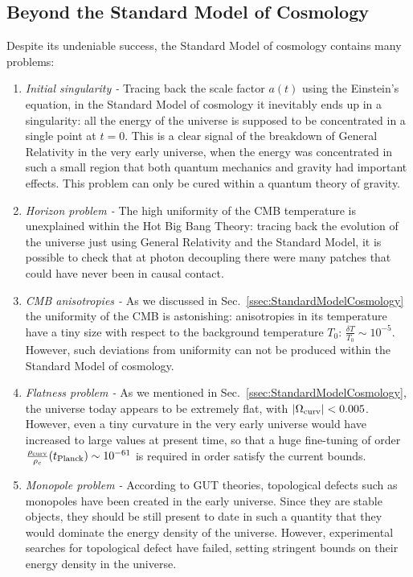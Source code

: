 \documentclass[12pt,a4paper]{book}
\newcommand{\ben}{\begin{enumerate}}
\newcommand{\een}{\end{enumerate}}
\begin{document}
\subsection{Beyond the Standard Model of Cosmology}
\label{ssec:BSMCosmology}

Despite its undeniable success, the Standard Model of cosmology contains many problems:
\ben
\item \textit{Initial singularity - } Tracing back the scale factor $a(t)$ using the Einstein's equation, in the Standard Model of cosmology it inevitably ends up in a singularity: all the energy of the universe is supposed to be concentrated in a single point at $t = 0$. This is a clear signal of the breakdown of General Relativity in the very early universe, when the energy was concentrated in such a small region that both quantum mechanics and gravity had important effects. This problem can only be cured within a quantum theory of gravity.
\item \textit{Horizon problem - } The high uniformity of the CMB temperature is unexplained within the Hot Big Bang Theory: tracing back the evolution of the universe just using General Relativity and the Standard Model, it is possible to check that at photon decoupling there were many patches that could have never been in causal contact.
\item \textit{CMB anisotropies - } As we discussed in Sec.~\ref{ssec:StandardModelCosmology} the uniformity of the CMB is astonishing: anisotropies in its temperature have a tiny size with respect to the background temperature $T_0$: $\frac{\delta T}{T_0} \sim 10^{-5}$. However, such deviations from uniformity can not be produced within the Standard Model of cosmology.
\item \textit{Flatness problem - } As we mentioned in Sec.~\ref{ssec:StandardModelCosmology}, the universe today appears to be extremely flat, with $\left|\Omega_{\rm curv}\right| < 0.005$. However, even a tiny curvature in the very early universe would have increased to large values at present time, so that a huge fine-tuning of order $\frac{\rho_{\rm curv}}{\rho_c}(t_{\rm Planck}) \sim 10^{-61}$ is required in order satisfy the current bounds.
\item \textit{Monopole problem - } According to GUT theories, topological defects such as monopoles have been created in the early universe. Since they are stable objects, they should be still present to date in such a quantity that they would dominate the energy density of the universe. However, experimental searches for topological defect have failed, setting stringent bounds on their energy density in the universe.
\een
\end{document}
